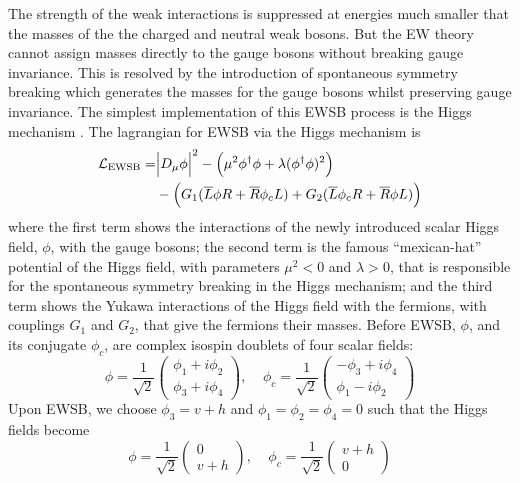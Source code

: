 The strength of the weak interactions is suppressed at energies 
much smaller that the masses of the 
the charged and neutral weak bosons. But the EW theory 
cannot assign masses directly to the gauge bosons without breaking 
gauge invariance. This is resolved by the introduction of 
spontaneous symmetry breaking which generates the masses for the 
gauge bosons whilst preserving gauge invariance. 
The simplest implementation of this EWSB process 
is the Higgs mechanism
\cite{PhysRevLett.13.321,PhysRevLett.13.508,PhysRevLett.13.585}.
The lagrangian for EWSB via the Higgs mechanism is 
\begin{equation}
\begin{aligned}
\mathcal{L}_{\textrm{EWSB}} =& \Big|
			D_{\mu}\phi\Big|^2 
			- \Big(\mu^2 \phi^{\dagger} \phi + \lambda (\phi^{\dagger}\phi)^2 \Big) \\
			&- \Big(G_1 (\overline{L}\phi R  + \overline{R}\phi_c L)
			      + G_2 (\overline{L}\phi_c R + \overline{R}\phi L) \Big)
\end{aligned}
\label{eq:lagrangian_ewsb}
\end{equation}
where the first term shows the interactions of the newly 
introduced scalar Higgs field, $\phi$, with the gauge bosons; 
the second term is the famous ``mexican-hat'' potential 
of the Higgs field, with parameters $\mu^2 < 0$ and $\lambda>0$, 
that is responsible for the spontaneous symmetry 
breaking in the Higgs mechanism;
and the third term shows the Yukawa interactions 
of the Higgs field with the fermions, with couplings $G_1$ and $G_2$,
that give the fermions their masses.
Before EWSB, $\phi$, and its conjugate $\phi_c$, 
are complex isospin doublets of four scalar fields:
\begin{equation}
\phi = \frac{1}{\sqrt{2}}
\begin{pmatrix} 
\phi_1 + i \phi_2 \\
\phi_3 + i \phi_4
\end{pmatrix}
,~~~~~
\phi_c = \frac{1}{\sqrt{2}}
\begin{pmatrix} 
-\phi_3 + i \phi_4 \\
\phi_1 - i \phi_2
\end{pmatrix}
\end{equation}
Upon EWSB, we choose $\phi_3=v+h$ and $\phi_1=\phi_2=\phi_4=0$
such that the Higgs fields become
\begin{equation}
\phi = \frac{1}{\sqrt{2}}
\begin{pmatrix} 
0\\
v+h
\end{pmatrix}
,~~~~~
\phi_c = \frac{1}{\sqrt{2}}
\begin{pmatrix} 
v + h\\
0
\end{pmatrix}
\end{equation}
